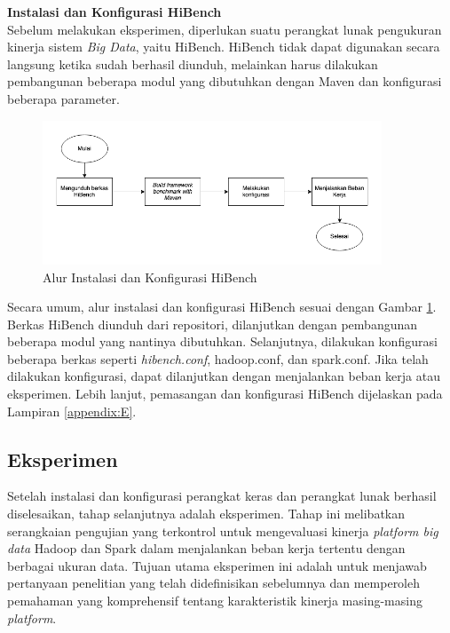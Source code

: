 \textbf{Instalasi dan Konfigurasi HiBench}\\
Sebelum melakukan eksperimen, diperlukan suatu perangkat lunak pengukuran kinerja sistem \textit{Big Data}, yaitu HiBench. HiBench tidak dapat digunakan secara langsung ketika sudah berhasil diunduh, melainkan harus dilakukan pembangunan beberapa modul yang dibutuhkan dengan Maven dan konfigurasi beberapa parameter. 

\begin{figure}[h]
    \centering
    \includegraphics[width=0.9\textwidth]{figures/ch03/hibench-flow.png}
    \caption{Alur Instalasi dan Konfigurasi HiBench}
    \label{fig:hibench-flow}
\end{figure}

Secara umum, alur instalasi dan konfigurasi HiBench sesuai dengan Gambar \ref{fig:hibench-flow}. Berkas HiBench diunduh dari repositori, dilanjutkan dengan pembangunan beberapa modul yang nantinya dibutuhkan. Selanjutnya, dilakukan konfigurasi beberapa berkas seperti \textit{hibench.conf}, hadoop.conf, dan spark.conf. Jika telah dilakukan konfigurasi, dapat dilanjutkan dengan menjalankan beban kerja atau eksperimen. Lebih lanjut, pemasangan dan konfigurasi HiBench dijelaskan pada Lampiran \ref{appendix:E}.



\subsection{Eksperimen}
Setelah instalasi dan konfigurasi perangkat keras dan perangkat lunak berhasil diselesaikan, tahap selanjutnya adalah eksperimen. Tahap ini melibatkan serangkaian pengujian yang terkontrol untuk mengevaluasi kinerja \textit{platform big data} Hadoop dan Spark dalam menjalankan beban kerja tertentu dengan berbagai ukuran data. Tujuan utama eksperimen ini adalah untuk menjawab pertanyaan penelitian yang telah didefinisikan sebelumnya dan memperoleh pemahaman yang komprehensif tentang karakteristik kinerja masing-masing \textit{platform}.

